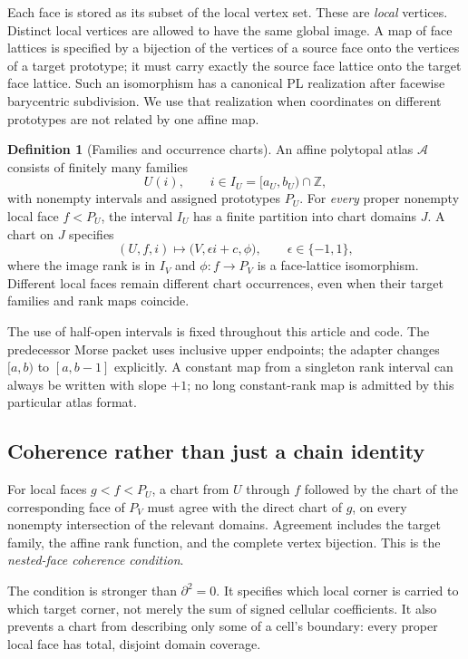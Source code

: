 \documentclass[11pt]{article}
\theoremstyle{definition}\newtheorem{definition}[theorem]{Definition}
\theoremstyle{remark}\newtheorem{remark}[theorem]{Remark}
\newcommand{\Z}{\mathbb Z}
\newcommand{\Atlas}{\mathcal A}
\begin{document}
Each face is stored as its subset of the local vertex set. These are \emph{local} vertices. Distinct local vertices are allowed to have the same global image. A map of face lattices is specified by a bijection of the vertices of a source face onto the vertices of a target prototype; it must carry exactly the source face lattice onto the target face lattice. Such an isomorphism has a canonical PL realization after facewise barycentric subdivision. We use that realization when coordinates on different prototypes are not related by one affine map.

\begin{definition}[Families and occurrence charts]
An affine polytopal atlas \(\Atlas\) consists of finitely many families
\[
                         U(i),\qquad i\in I_U=[a_U,b_U)\cap\Z,
\]
with nonempty intervals and assigned prototypes \(P_U\). For \emph{every} proper nonempty local face \(f<P_U\), the interval \(I_U\) has a finite partition into chart domains \(J\). A chart on \(J\) specifies
\begin{equation}\label{eq:chart}
 (U,f,i)\longmapsto \bigl(V,\epsilon i+c,\phi\bigr),
 \qquad \epsilon\in\{-1,1\},
\end{equation}
where the image rank is in \(I_V\) and \(\phi:f\to P_V\) is a face-lattice isomorphism. Different local faces remain different chart occurrences, even when their target families and rank maps coincide.
\end{definition}

The use of half-open intervals is fixed throughout this article and code. The predecessor Morse packet uses inclusive upper endpoints; the adapter changes \([a,b)\) to \([a,b-1]\) explicitly. A constant map from a singleton rank interval can always be written with slope \(+1\); no long constant-rank map is admitted by this particular atlas format.

\subsection{Coherence rather than just a chain identity}
For local faces \(g<f<P_U\), a chart from \(U\) through \(f\) followed by the chart of the corresponding face of \(P_V\) must agree with the direct chart of \(g\), on every nonempty intersection of the relevant domains. Agreement includes the target family, the affine rank function, and the complete vertex bijection. This is the \emph{nested-face coherence condition}.

The condition is stronger than \(\partial^2=0\). It specifies which local corner is carried to which target corner, not merely the sum of signed cellular coefficients. It also prevents a chart from describing only some of a cell's boundary: every proper local face has total, disjoint domain coverage.
\end{document}
